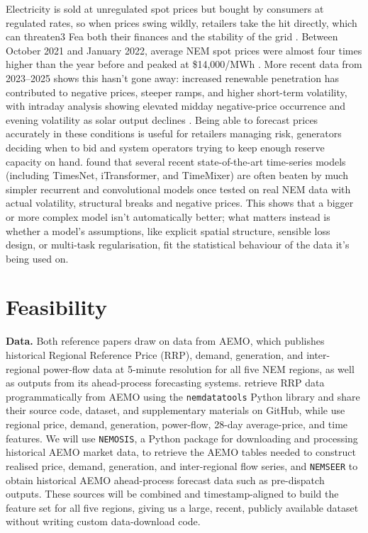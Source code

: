 \documentclass[a4paper,11pt]{article} %
\begin{document}
Electricity is sold at unregulated spot prices but bought by consumers at regulated
rates, so when prices swing wildly, retailers take the hit directly, which can threaten3 Fea
both their finances and the stability of the grid \citep{li2025mgaal}. Between October
2021 and January 2022, average NEM spot prices were almost four times higher than the
year before and peaked at \$14{,}000/MWh \citep{li2025mgaal}. More recent data from
2023--2025 shows this hasn't gone away: increased renewable penetration has contributed
to negative prices, steeper ramps, and higher short-term volatility, with intraday
analysis showing elevated midday negative-price occurrence and evening volatility as
solar output declines \citep{gani2026deeptime}. Being able to forecast prices accurately
in these conditions is useful for retailers managing risk, generators deciding when to
bid and system operators trying to keep enough reserve capacity on hand.
\citet{gani2026deeptime} found that several recent state-of-the-art time-series models
(including TimesNet, iTransformer, and TimeMixer) are often beaten by much simpler
recurrent and convolutional models once tested on real NEM data with actual volatility,
structural breaks and negative prices. This shows that a bigger or more complex model
isn't automatically better; what matters instead is whether a model's assumptions, like
explicit spatial structure, sensible loss design, or multi-task regularisation, fit the
statistical behaviour of the data it's being used on.

\section{Feasibility}

\textbf{Data.} Both reference papers draw on data from AEMO, which publishes historical
Regional Reference Price (RRP), demand, generation, and inter-regional power-flow data
at 5-minute resolution for all five NEM regions, as well as outputs from its ahead-process
forecasting systems. \citet{gani2026deeptime} retrieve RRP data programmatically from
AEMO using the \texttt{nemdatatools} Python library and share their source code, dataset,
and supplementary materials on GitHub, while \citet{li2025mgaal} use regional price,
demand, generation, power-flow, 28-day average-price, and time features. We will use
\texttt{NEMOSIS}, a Python package for downloading and processing historical AEMO market
data, to retrieve the AEMO tables needed to construct realised price, demand, generation,
and inter-regional flow series, and \texttt{NEMSEER} to obtain historical AEMO
ahead-process forecast data such as pre-dispatch outputs. These sources will be combined
and timestamp-aligned to build the feature set for all five regions, giving us a large,
recent, publicly available dataset without writing custom data-download code. \\
\end{document}
